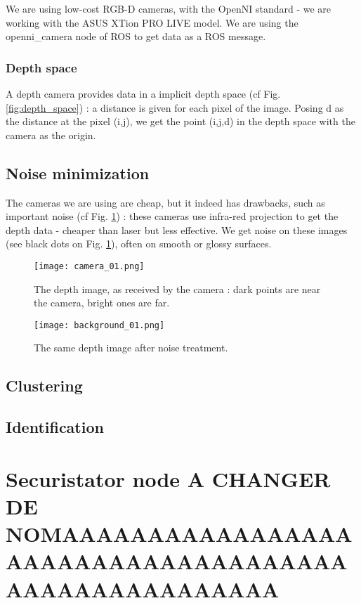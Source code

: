 \documentclass[smallextended]{svjour3}
\begin{document}
We are using low-cost RGB-D cameras, with the OpenNI standard - we are working with the ASUS XTion PRO LIVE model. We are using the openni\_camera node of ROS \cite{Refopenni} to get data as a ROS message.

\subsubsection{Depth space}
A depth camera provides data in a implicit depth space (cf Fig. \ref{fig:depth_space}) : a distance is given for each pixel of the image. Posing d as the distance at the pixel (i,j), we get the point (i,j,d) in the depth space with the camera as the origin.

\subsection{Noise minimization}

The cameras we are using are cheap, but it indeed has drawbacks, such as important noise (cf Fig. \ref{fig:camera1}) : these cameras use infra-red projection to get the depth data - cheaper than laser but less effective. We get noise on these images (see black dots on Fig. \ref{fig:camera1}), often on smooth or glossy surfaces.

\begin{figure}
\centering
\texttt{[image: camera\_01.png]}
\caption{\label{fig:camera1}The depth image, as received by the camera : dark points are near the camera, bright ones are far.}
\end{figure}

\begin{figure}
\centering
\texttt{[image: background\_01.png]}
\caption{\label{fig:background1}The same depth image after noise treatment.}
\end{figure}

\subsection{Clustering}

\subsection{Identification}

\section{Securistator node A CHANGER DE NOMAAAAAAAAAAAAAAAAAAAAAAAAAAAAAAAAAAAAAAAAAAAAAAAAAAAAA}
\end{document}
